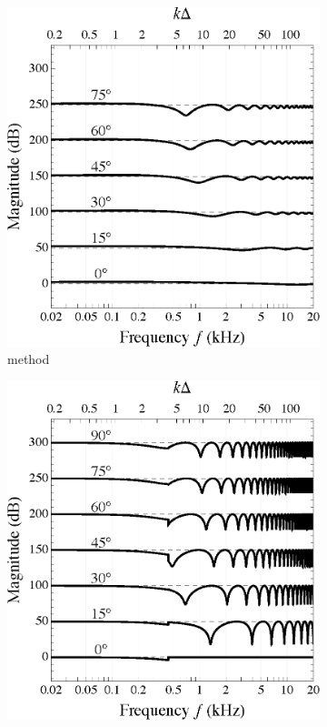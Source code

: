 \begin{figure}[t]
  \centering
  \begin{subfigure}[b]{0.49\textwidth}
    \includegraphics[width=\textwidth]{09_thiergart_comparison/figures/sourceAz_freqResp_thiergart.eps}
    \caption{\citet{Thiergart2013} method}
    \label{fig:09_Thiergart_Comparison:Azimuth_Dependence:Thiergart}
  \end{subfigure}
  \hfill
  \begin{subfigure}[b]{0.49\textwidth}
    \includegraphics[width=\textwidth]{08_proposed_method/figures/sourceAz_freqResp_validhybrid.eps}

\end{subfigure}
\end{figure}
